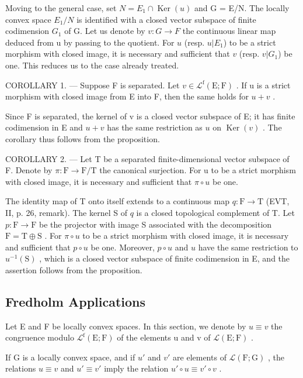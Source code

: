 Moving to the general case, set \(N = E_{1} \cap \operatorname{Ker}(u)\) and G = E/N. The locally convex space \(E_{1}/N\) is identified with a closed vector subspace of finite codimension \(G_{1}\) of G. Let us denote by \(v\colon G \to F\) the continuous linear map deduced from u by passing to the quotient. For \(u\) (resp. \(u|E_{1}\)) to be a strict morphism with closed image, it is necessary and sufficient that \(v\) (resp. \(v|G_{1}\)) be one. This reduces us to the case already treated.

COROLLARY 1. --- Suppose F is separated. Let \(v \in \mathcal{L}^{\mathrm{f}}(\mathrm{E};\mathrm{F})\) . If u is a strict morphism with closed image from E into F, then the same holds for \(u + v\) .

Since F is separated, the kernel of v is a closed vector subspace of E; it has finite codimension in E and \(u + v\) has the same restriction as \(u\) on \(\operatorname{Ker}(v)\) . The corollary thus follows from the proposition.

COROLLARY 2. --- Let T be a separated finite-dimensional vector subspace of F. Denote by \(\pi\colon\mathrm{F}\to\mathrm{F}/\mathrm{T}\) the canonical surjection. For u to be a strict morphism with closed image, it is necessary and sufficient that \(\pi\circ u\) be one.

The identity map of T onto itself extends to a continuous map \(q \colon \mathrm{F} \to \mathrm{T}\) (EVT, II, p. 26, remark). The kernel S of \(q\) is a closed topological complement of T. Let \(p \colon \mathrm{F} \to \mathrm{F}\) be the projector with image S associated with the decomposition \(\mathrm{F} = \mathrm{T} \oplus \mathrm{S}\) . For \(\pi \circ u\) to be a strict morphism with closed image, it is necessary and sufficient that \(p \circ u\) be one. Moreover, \(p \circ u\) and \(u\) have the same restriction to \(u^{-1}(\mathrm{S})\) , which is a closed vector subspace of finite codimension in E, and the assertion follows from the proposition.

\subsection{Fredholm Applications}

Let E and F be locally convex spaces. In this section, we denote by \(u \equiv v\) the congruence modulo \(\mathcal{L}^{\mathrm{f}}(\mathrm{E};\mathrm{F})\) of the elements u and v of \(\mathcal{L}(\mathrm{E};\mathrm{F})\) .

If G is a locally convex space, and if \(u'\) and \(v'\) are elements of \(\mathcal{L}(\mathrm{F};\mathrm{G})\) , the relations \(u \equiv v\) and \(u' \equiv v'\) imply the relation \(u' \circ u \equiv v' \circ v\) .

